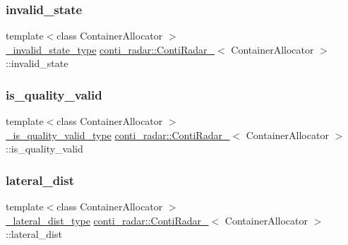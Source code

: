 \subsubsection{\texorpdfstring{invalid\+\_\+state}{invalid\_state}}
{\footnotesize\ttfamily template$<$class Container\+Allocator $>$ \\
\hyperlink{structconti__radar_1_1ContiRadar___a2a59a60898931fdd385414285db0ddb7}{\+\_\+invalid\+\_\+state\+\_\+type} \hyperlink{structconti__radar_1_1ContiRadar__}{conti\+\_\+radar\+::\+Conti\+Radar\+\_\+}$<$ Container\+Allocator $>$\+::invalid\+\_\+state}

\mbox{\label{structconti__radar_1_1ContiRadar___acb77fa07667b08847e84a27763973690}} 
\subsubsection{\texorpdfstring{is\+\_\+quality\+\_\+valid}{is\_quality\_valid}}
{\footnotesize\ttfamily template$<$class Container\+Allocator $>$ \\
\hyperlink{structconti__radar_1_1ContiRadar___a03d5186874dd855dae68a07e423d9825}{\+\_\+is\+\_\+quality\+\_\+valid\+\_\+type} \hyperlink{structconti__radar_1_1ContiRadar__}{conti\+\_\+radar\+::\+Conti\+Radar\+\_\+}$<$ Container\+Allocator $>$\+::is\+\_\+quality\+\_\+valid}

\mbox{\label{structconti__radar_1_1ContiRadar___acb29fb122326eddc34e85f76e80690e4}} 
\subsubsection{\texorpdfstring{lateral\+\_\+dist}{lateral\_dist}}
{\footnotesize\ttfamily template$<$class Container\+Allocator $>$ \\
\hyperlink{structconti__radar_1_1ContiRadar___a2c5d5de6c5ec7dc7b53d84802b54d522}{\+\_\+lateral\+\_\+dist\+\_\+type} \hyperlink{structconti__radar_1_1ContiRadar__}{conti\+\_\+radar\+::\+Conti\+Radar\+\_\+}$<$ Container\+Allocator $>$\+::lateral\+\_\+dist}

